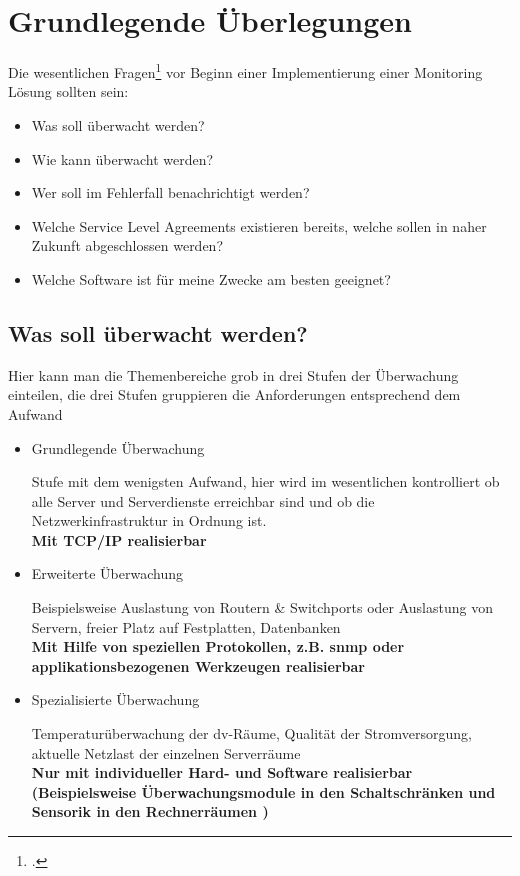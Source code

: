 \documentclass[12pt,a4paper,parskip,listof=totoc,bibliography=totoc]{scrreprt}
\begin{document}
	\section{Grundlegende Überlegungen}
	Die wesentlichen Fragen\footcite[nach][]{veltnagios1} vor Beginn einer Implementierung einer Monitoring Lösung sollten sein:
	\begin{itemize}
		\item Was soll überwacht werden?
		\item Wie kann überwacht werden?
		\item Wer soll im Fehlerfall benachrichtigt werden?
		\item Welche Service Level Agreements existieren bereits, welche sollen in naher Zukunft abgeschlossen werden?
		\item Welche Software ist für meine Zwecke am besten geeignet?
	\end{itemize}
	\subsection{Was soll überwacht werden?}
	Hier kann man die Themenbereiche grob in drei Stufen der Überwachung einteilen, die drei Stufen gruppieren die Anforderungen entsprechend dem Aufwand
	\begin{itemize}
		\item Grundlegende Überwachung
		
		Stufe mit dem wenigsten Aufwand, hier wird im wesentlichen kontrolliert ob alle Server und Serverdienste erreichbar sind und ob die Netzwerkinfrastruktur in Ordnung ist.\\
		\textbf{Mit TCP/IP realisierbar}
		\item Erweiterte Überwachung
		
		Beispielsweise Auslastung von Routern \& Switchports oder Auslastung von Servern, freier Platz auf Festplatten, Datenbanken\\
		\textbf{Mit Hilfe von speziellen Protokollen, z.B. \acrshort{snmp} oder applikationsbezogenen Werkzeugen realisierbar}
		\item Spezialisierte Überwachung
		
		Temperaturüberwachung der \acrshort{dv}-Räume, Qualität der Stromversorgung, aktuelle Netzlast der einzelnen Serverräume\\
		\textbf{Nur mit individueller Hard- und Software realisierbar (Beispielsweise Überwachungsmodule in den Schaltschränken und Sensorik in den Rechnerräumen )}
	\end{itemize}
\end{document}
